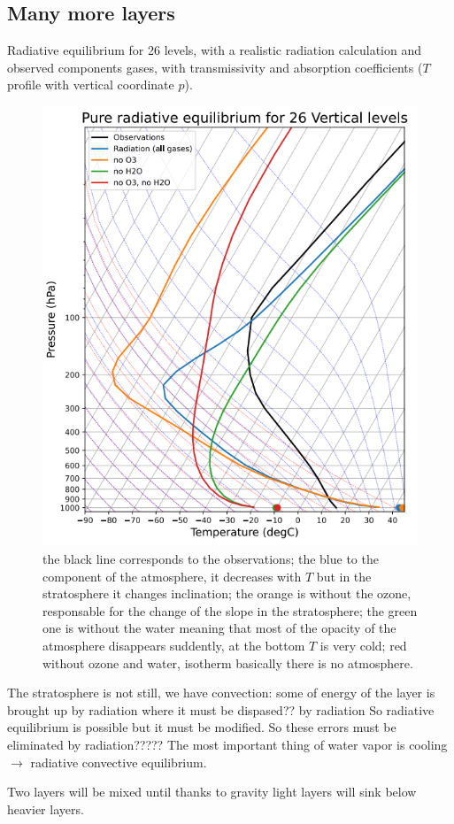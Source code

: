 \subsection{Many more layers}
Radiative equilibrium for 26 levels, with a realistic radiation calculation and observed components gases, with transmissivity and absorption coefficients ($T$ profile with vertical coordinate $p$).
\begin{figure}[h!]
    \centering
    \includegraphics[width=0.5\linewidth]{uploads/Screenshot 2024-11-20 130113.png}
    \caption{the black line corresponds to the observations; the blue to the component of the atmosphere, it decreases with $T$ but in the stratosphere it changes inclination; the orange is without the ozone, responsable for the change of the slope in the stratosphere; the green one is without the water meaning that most of the opacity of the atmosphere disappears suddently, at the bottom $T$ is very cold; red without ozone and water, isotherm basically there is no atmosphere.}
    \label{fig:enter-label}
\end{figure}
The stratosphere is not still, we have convection: some of energy of the layer is brought up by radiation where it must be dispased?? by radiation So radiative equilibrium is possible but it must be modified. So these errors must be eliminated by radiation????? %
The most important thing of water vapor is cooling $\rightarrow$ radiative convective equilibrium. 



Two layers will be mixed until thanks to gravity light layers will sink below heavier layers.
